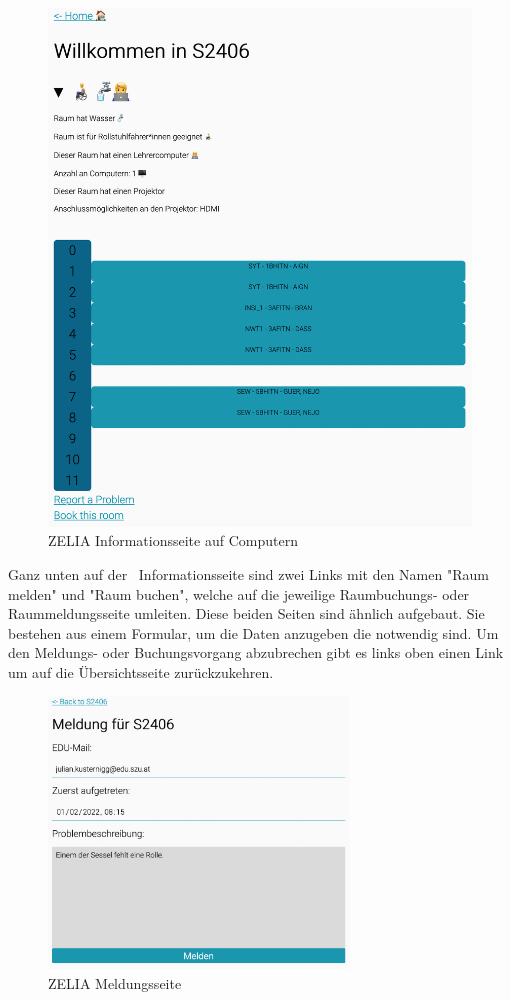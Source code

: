 \begin{figure}[H]
    \centering
    \includegraphics[width=120mm]{media/WebComponents/Rauminformationsseite_light.png}
    \caption{ZELIA Informationsseite auf Computern}
    \label{fig:zeliainfopage}
\end{figure}

Ganz unten auf der \ZELIA\ Informationsseite sind zwei Links mit den Namen "Raum melden" und "Raum buchen", welche auf die jeweilige Raumbuchungs- oder Raummeldungsseite umleiten. Diese beiden Seiten sind ähnlich aufgebaut. Sie bestehen aus einem Formular, um die Daten anzugeben die notwendig sind. Um den Meldungs- oder Buchungsvorgang abzubrechen gibt es links oben einen Link um auf die Übersichtsseite zurückzukehren.

\begin{figure}[H]
    \centering
    \includegraphics[width=80mm]{media/WebComponents/Meldungsseite_light.png}
    \caption{ZELIA Meldungsseite}
    
\end{figure}

